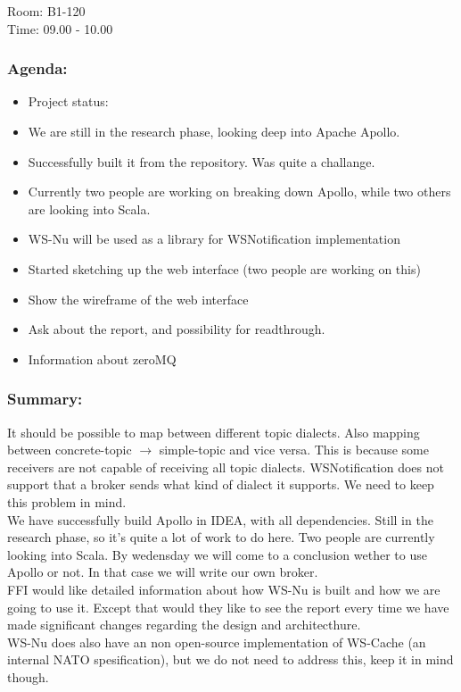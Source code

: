 Room: B1-120 \\
\noindent Time: 09.00 - 10.00

\subsubsection*{Agenda:}
\begin{itemize}
\setlength{\itemsep}{0cm}%
\item Project status:
\item We are still in the research phase, looking deep into Apache Apollo.
\item Successfully built it from the repository. Was quite a challange. 
\item Currently two people are working on breaking down Apollo, while two others are looking into Scala. 
\item WS-Nu will be used as a library for WSNotification implementation
\item Started sketching up the web interface (two people are working on this)
\item Show the wireframe of the web interface
\item Ask about the report, and possibility for readthrough. 
\item Information about zeroMQ
\end{itemize}

\subsubsection*{Summary:} 
It should be possible to map between different topic dialects. Also mapping between concrete-topic $\rightarrow$ simple-topic and vice versa. This is because some receivers are not capable of receiving all topic dialects. WSNotification does not support that a broker sends what kind of dialect it supports. We need to keep this problem in mind. \\

\noindent We have successfully build Apollo in IDEA, with all dependencies. Still in the research phase, so it’s quite a lot of work to do here. Two people are currently looking into Scala. By wedensday  we will come to a conclusion wether to use Apollo or not. In that case we will write our own broker. \\


\noindent FFI would like detailed information about how WS-Nu is built and how we are going to use it. Except that would they like to see the report every time we have made significant changes regarding the design and architecthure. \\


\noindent WS-Nu does also have an non open-source implementation of WS-Cache (an internal NATO spesification),  but we do not need to address this, keep it in mind though. \\

\clearpage